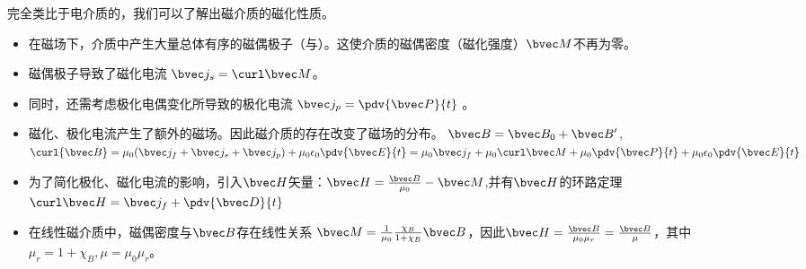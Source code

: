 
完全类比于电介质的，我们可以了解出磁介质的磁化性质。

\begin{itemize}
\item 在磁场下，介质中产生大量总体有序的磁偶极子（与）。这使介质的磁偶密度（磁化强度）$\bvec M$不再为零。

\item 磁偶极子导致了磁化电流 $\bvec j_s = \curl \bvec M$。
\item 同时，还需考虑极化电偶变化所导致的极化电流 $\bvec j_p = \pdv{\bvec P}{t}$ 。 %

\item 磁化、极化电流产生了额外的磁场。因此磁介质的存在改变了磁场的分布。 $\bvec B = \bvec B_0 + \bvec B'$, $\curl {\bvec B} = \mu_0 (\bvec j_f + \bvec j_s + \bvec j_p) + \mu_0\epsilon_0 \pdv{\bvec E}{t} = \mu_0 \bvec j_f + \mu_0 \curl \bvec M + \mu_0 \pdv{\bvec P}{t} + \mu_0 \epsilon_0 \pdv{\bvec E}{t}$

\item 为了简化极化、磁化电流的影响，引入$\bvec H$矢量：$\bvec H = \frac{\bvec B}{\mu_0} - \bvec M$,并有$\bvec H$的环路定理 $\curl \bvec H = \bvec j_f + \pdv{\bvec D}{t}$

\item 在线性磁介质中，磁偶密度与$\bvec B$存在线性关系  $\bvec M = \frac{1}{\mu_0} \frac{\chi_B}{1+\chi_B}\bvec B$，因此$\bvec H = \frac{\bvec B}{\mu_0\mu_r}= \frac{\bvec B}{\mu}$，其中$\mu_r = 1+\chi_B,  \mu = \mu_0 \mu_r$。
\end{itemize}
